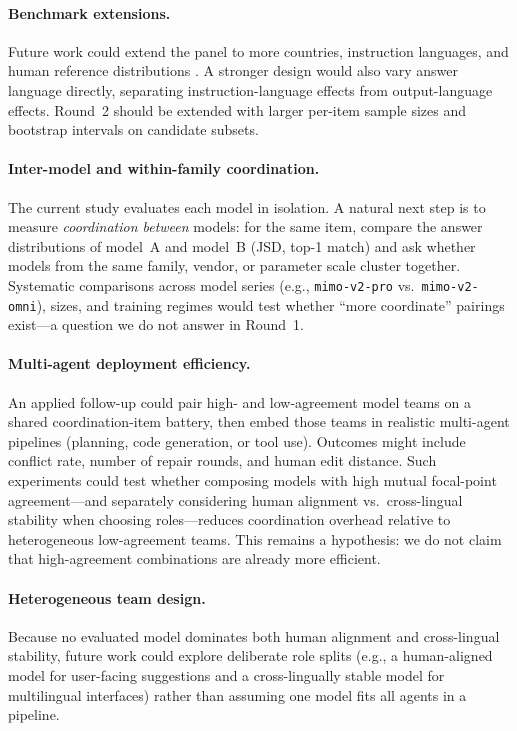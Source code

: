 \documentclass[11pt]{article}
\begin{document}
\paragraph{Benchmark extensions.}
Future work could extend the panel to more countries, instruction languages, and human reference distributions \cite{perez2026}. A stronger design would also vary answer language directly, separating instruction-language effects from output-language effects. Round~2 should be extended with larger per-item sample sizes and bootstrap intervals on candidate subsets.

\paragraph{Inter-model and within-family coordination.}
The current study evaluates each model in isolation. A natural next step is to measure \emph{coordination between} models: for the same item, compare the answer distributions of model~A and model~B (JSD, top-1 match) and ask whether models from the same family, vendor, or parameter scale cluster together. Systematic comparisons across model series (e.g., \texttt{mimo-v2-pro} vs.\ \texttt{mimo-v2-omni}), sizes, and training regimes would test whether ``more coordinate'' pairings exist---a question we do not answer in Round~1.

\paragraph{Multi-agent deployment efficiency.}
An applied follow-up could pair high- and low-agreement model teams on a shared coordination-item battery, then embed those teams in realistic multi-agent pipelines (planning, code generation, or tool use). Outcomes might include conflict rate, number of repair rounds, and human edit distance. Such experiments could test whether composing models with high mutual focal-point agreement---and separately considering human alignment vs.\ cross-lingual stability when choosing roles---reduces coordination overhead relative to heterogeneous low-agreement teams. This remains a hypothesis: we do not claim that high-agreement combinations are already more efficient.

\paragraph{Heterogeneous team design.}
Because no evaluated model dominates both human alignment and cross-lingual stability, future work could explore deliberate role splits (e.g., a human-aligned model for user-facing suggestions and a cross-lingually stable model for multilingual interfaces) rather than assuming one model fits all agents in a pipeline.
\end{document}
